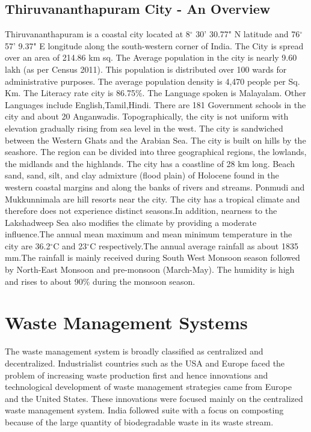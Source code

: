\documentclass[12pt,a4paper]{  report}
\begin{document}
\section{Thiruvananthapuram City - An Overview}
\begin{justify}
	Thiruvananthapuram is a coastal city located at 8$^\circ$ 30' 30.77" N latitude and 76$^\circ$ 57' 9.37" E longitude along the south-western corner of India. The City is spread over an area of 214.86 km sq. The Average population in the city is nearly 9.60 lakh (as per Census 2011). This population is distributed over 100 wards for administrative purposes. The average population density is 4,470 people per Sq. Km. The Literacy rate city is 86.75\%. The Language spoken is Malayalam. Other Languages include English,Tamil,Hindi. There are 181 Government schools in the city and about 20 Anganwadis.	
	Topographically, the city is not uniform with elevation gradually rising from sea level in the west. The city is sandwiched between the Western Ghats and the Arabian Sea. The city is built on hills by the seashore. The region can be divided into three geographical regions, the lowlands, the midlands and the highlands. The city has a coastline of 28 km long. Beach sand, sand, silt, and clay admixture (flood plain) of Holocene found in the western coastal margins and along the banks of rivers and streams. Ponmudi and Mukkunnimala are hill resorts near the city.
	The city has a tropical climate and therefore does not experience distinct seasons.In addition, nearness to the Lakshadweep Sea also modifies the climate by providing a moderate influence.The annual mean maximum and mean minimum temperature in the city are 36.2$^\circ$C and 23$^\circ$C respectively.The annual average rainfall as about 1835 mm.The rainfall is mainly received during South West Monsoon season followed by North-East Monsoon and pre-monsoon (March-May). The humidity is high and rises to about 90\% during the monsoon season.
\end{justify}	
\chapter{\textbf{Waste Management Systems}}
\begin{justify}
	The waste management system is broadly classified as centralized and decentralized. Industrialist countries such as the USA and Europe faced the problem of increasing waste production first and hence innovations and technological development of waste management strategies came from Europe and the United States. These innovations were focused mainly on the centralized waste management system. India followed suite with a focus on composting because of the large quantity of biodegradable waste in its waste stream.
\end{justify}
\end{document}
